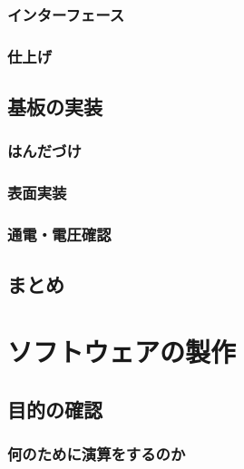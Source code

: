\documentclass[dvipdfmx]{jsbook}
\begin{document}
\subsection{インターフェース}

\subsection{仕上げ}


\section{基板の実装}

\subsection{はんだづけ}

\subsection{表面実装}

\subsection{通電・電圧確認}


\section{まとめ}

\clearpage

\chapter{ソフトウェアの製作}

\section{目的の確認}

\subsection{何のために演算をするのか}
\end{document}
